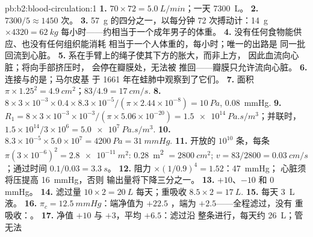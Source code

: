 \begin{solution}{pb:b2:blood-circulation:1}
\textbf{1.} $70\times 72 = \qty{5.0}{L/min}$；一天 \qty{7300}{L}。
\textbf{2.} $7300/5 \approx 1450$ 次。
\textbf{3.} \qty{57}{g} 的四分之一，以每分钟 72 次搏动计：\qty{14}{g}
$\times 4320 = \qty{62}{kg}$ 每小时——约相当于一个成年男子的体重。
\textbf{4.} 没有任何食物能供应、也没有任何组织能消耗
相当于一个人体重的，每小时；唯一的出路是
同一批回流到心脏。
\textbf{5.} 系在手臂上的绳子使其下方的胀大，而非上方，
因此血流向心脏；将向手部挤压时，
会停在瓣膜处，无法被
推回——瓣膜只允许流向心脏。
\textbf{6.} 连接与的是；马尔皮基
于 1661 年在蛙肺中观察到了它们。
\textbf{7.} 面积 $\pi\times 1.25^{2} = \qty{4.9}{cm^2}$；$83/4.9 =
\qty{17}{cm/s}$.
\textbf{8.} $8\times 3\times 10^{-3}\times 0.4\times 8.3\times
10^{-5}/(\pi\times 2.44\times 10^{-8}) = \qty{10}{Pa}$, \qty{0.08}{mmHg}.
\textbf{9.} $R_{1} = 8\times 3\times 10^{-3}\times 10^{-3}/(\pi\times
5.06\times 10^{-20}) = \qty{1.5e14}{Pa.s/m^3}$；并联时，
$1.5\times 10^{14}/3\times 10^{6} = \qty{5.0e7}{Pa.s/m^3}$.
\textbf{10.} $8.3\times 10^{-5}\times 5.0\times 10^{7} = \qty{4200}{Pa}
= \qty{31}{mmHg}$.
\textbf{11.} 开放的 $10^{10}$ 条，每条 $\pi(3\times 10^{-6})^{2}
= \qty{2.8e-11}{m^2}$: \qty{0.28}{m^2} $= \qty{2800}{cm^2}$; $v =
83/2800 = \qty{0.03}{cm/s}$；通过时间 $0.1/0.03 = \qty{3.3}{s}$。
\textbf{12.} 阻力 $\times(1/0.9)^{4} = 1.52$：\qty{47}{mmHg}；
心脏须将压提高 \qty{16}{mmHg}，否则
输出量将下降三分之一。
\textbf{13.} $+10$、$-10$ 和 $0$ mmHg。
\textbf{14.} 滤过量 $10\times 2 = \qty{20}{L}$ 每天；重吸收
$8.5\times 2 = \qty{17}{L}$.
\textbf{15.} 每天 \qty{3}{L} 液。
\textbf{16.} $\pi_c = \qty{12.5}{mmHg}$：端净值为 $+22.5$
，端为 $+2.5$——全程滤过，没有
重吸收：。
\textbf{17.} 净值 $+10$ 与 $+3$，平均 $+6.5$：滤过沿
整条进行，每天约 \qty{26}{L}；管无法

\end{solution}
